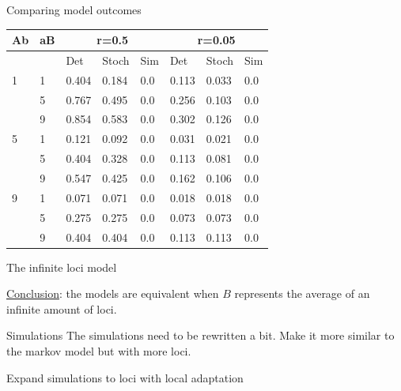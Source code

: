 \documentclass{beamer}
\begin{document}
\begin{frame}{Comparing model outcomes}

\begin{tabular}{l | l | lll | lll}  
Ab& aB & \multicolumn{3}{c}{r=0.5} & \multicolumn{3}{c}{r=0.05} \\
\midrule
& & Det & Stoch & Sim & Det & Stoch & Sim \\
\midrule
1 & 1 & 0.404 & 0.184 & 0.0         & 0.113 & 0.033 & 0.0\\
     & 5 & 0.767 & 0.495 & 0.0         & 0.256 & 0.103 & 0.0 \\
     & 9 & 0.854 & 0.583 & 0.0         & 0.302 & 0.126 & 0.0 \\
     \midrule
5 & 1 & 0.121 & 0.092 & 0.0         & 0.031 & 0.021 & 0.0 \\
     & 5 & 0.404 & 0.328 & 0.0         & 0.113 & 0.081 & 0.0 \\
     & 9 & 0.547 & 0.425 & 0.0          & 0.162 & 0.106 & 0.0\\
     \midrule
9 & 1 & 0.071 & 0.071 & 0.0         & 0.018 & 0.018 & 0.0 \\
     & 5 & 0.275 & 0.275 & 0.0         & 0.073 & 0.073 & 0.0 \\
     & 9 & 0.404 & 0.404 & 0.0          & 0.113 & 0.113 & 0.0\\
\end{tabular}
    
\end{frame}



\begin{frame}{The infinite loci model}

\underline{Conclusion}: the models are equivalent when $B$ represents the average of an infinite amount of loci.
    
\end{frame}

\begin{frame}{Simulations}
    The simulations need to be rewritten a bit. Make it more similar to the markov model but with more loci. 
\end{frame}

\begin{frame}{Expand simulations to loci with local adaptation}
    
\end{frame}
\end{document}
